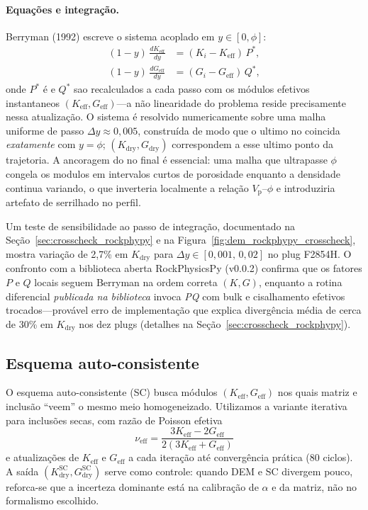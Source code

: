 \documentclass[11pt,a4paper]{article}
\numberwithin{equation}{section}
\newcommand{\Vp}{\ensuremath{V_{\mathrm{p}}}}
\begin{document}
\paragraph{Equações e integração.}
Berryman (1992) escreve o sistema acoplado em $y \in [0,\phi]$:
\begin{align}
  (1-y)\,\frac{dK_{\mathrm{eff}}}{dy} &= (K_i - K_{\mathrm{eff}})\,P^*,
  \label{eq:dem_k} \\
  (1-y)\,\frac{dG_{\mathrm{eff}}}{dy} &= (G_i - G_{\mathrm{eff}})\,Q^*,
  \label{eq:dem_g}
\end{align}
onde $P^*$ é e $Q^*$ sao recalculados a cada passo com os módulos efetivos
instantaneos $(K_{\mathrm{eff}}, G_{\mathrm{eff}})$---a não linearidade do
problema reside precisamente nessa atualização.
O sistema é resolvido numericamente sobre uma malha uniforme de passo
$\Delta y \approx 0{,}005$, construída de modo que o ultimo no coincida
\emph{exatamente} com $y = \phi$;
$(K_{\mathrm{dry}}, G_{\mathrm{dry}})$ correspondem a esse ultimo ponto da
trajetoria.
A ancoragem do no final é essencial: uma malha que ultrapasse $\phi$ congela
os modulos em intervalos curtos de porosidade enquanto a densidade continua
variando, o que inverteria localmente a relação \Vp{}--$\phi$ e introduziria
artefato de serrilhado no perfil.

Um teste de sensibilidade ao passo de integração, documentado na
Seção~\ref{sec:crosscheck_rockphypy} e na
Figura~\ref{fig:dem_rockphypy_crosscheck}, mostra variação de 2,7\%
em $K_{\mathrm{dry}}$ para $\Delta y \in [0{,}001,\,0{,}02]$ no plug F2854H.
O confronto com a biblioteca aberta RockPhysicsPy (v0.0.2) confirma que os
fatores $P$ e $Q$ locais seguem Berryman na ordem correta $(K, G)$, enquanto a
rotina diferencial \emph{publicada na biblioteca} invoca \emph{PQ} com bulk e
cisalhamento efetivos trocados---provável erro de implementação que
explica divergência média de cerca de 30\% em $K_{\mathrm{dry}}$ nos dez
plugs (detalhes na Seção~\ref{sec:crosscheck_rockphypy}).

\subsection{Esquema auto-consistente}

O esquema auto-consistente (SC) busca módulos $(K_{\mathrm{eff}}, G_{\mathrm{eff}})$
nos quais matriz e inclusão ``veem'' o mesmo meio homogeneizado.
Utilizamos a variante iterativa para inclusões secas, com razão de Poisson
efetiva
\begin{equation}
  \nu_{\mathrm{eff}} = \frac{3K_{\mathrm{eff}} - 2G_{\mathrm{eff}}}
                              {2(3K_{\mathrm{eff}} + G_{\mathrm{eff}})}
  \label{eq:nu_sc}
\end{equation}
e atualizações de $K_{\mathrm{eff}}$ e $G_{\mathrm{eff}}$ a cada iteração até
convergência prática (80 ciclos).
A saída $(K_{\mathrm{dry}}^{\mathrm{SC}}, G_{\mathrm{dry}}^{\mathrm{SC}})$
serve como controle: quando DEM e SC divergem pouco, reforca-se que a
incerteza dominante está na calibração de $\alpha$ e da matriz, não no
formalismo escolhido.
\end{document}
